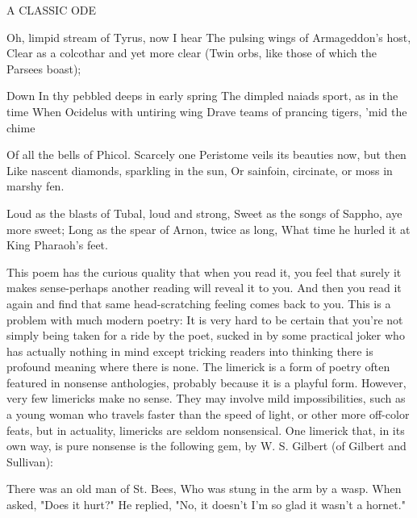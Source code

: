                                      A CLASSIC ODE

                       Oh, limpid stream of Tyrus, now I hear
                       The pulsing wings of Armageddon's host,
                       Clear as a colcothar and yet more clear
                       (Twin orbs, like those of which the Parsees boast);





                       Down In thy pebbled deeps in early spring
                       The dimpled naiads sport, as in the time
                       When Ocidelus with untiring wing
                       Drave teams of prancing tigers, 'mid the chime

                       Of all the bells of Phicol. Scarcely one
                       Peristome veils its beauties now, but then
                       Like nascent diamonds, sparkling in the sun,
                       Or sainfoin, circinate, or moss in marshy fen.

                       Loud as the blasts of Tubal, loud and strong,
                       Sweet as the songs of Sappho, aye more sweet;
                       Long as the spear of Arnon, twice as long,
                       What time he hurled it at King Pharaoh's feet.

This poem has the curious quality that when you read it, you feel that surely it makes
sense-perhaps another reading will reveal it to you. And then you read it again and find
that same head-scratching feeling comes back to you. This is a problem with much
modern poetry: It is very hard to be certain that you're not simply being taken for a ride
by the poet, sucked in by some practical joker who has actually nothing in mind except
tricking readers into thinking there is profound meaning where there is none.
        The limerick is a form of poetry often featured in nonsense anthologies, probably
because it is a playful form. However, very few limericks make no sense. They may
involve mild impossibilities, such as a young woman who travels faster than the speed of
light, or other more off-color feats, but in actuality, limericks are seldom nonsensical.
One limerick that, in its own way, is pure nonsense is the following gem, by W. S.
Gilbert (of Gilbert and Sullivan):

                       There was an old man of St. Bees,
                       Who was stung in the arm by a wasp.
                       When asked, "Does it hurt?"
                       He replied, "No, it doesn't
                       I'm so glad it wasn't a hornet."

